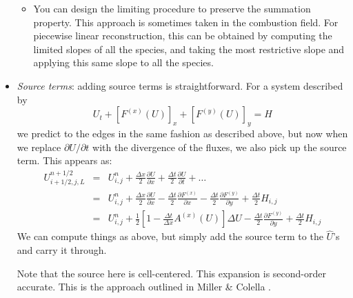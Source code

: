 \documentclass[11pt]{article}
\begin{document}
\begin{itemize}
\begin{itemize}
\item You can design the limiting procedure to preserve the summation
property.  This approach is sometimes taken in the combustion field. 
For piecewise linear reconstruction, this can be obtained by computing
the limited slopes of all the species, and taking the most restrictive
slope and applying this same slope to all the species.
\end{itemize}

\item {\em Source terms}: adding source terms is straightforward.  For
a system described by
\begin{equation}
U_t + [F^{(x)}(U)]_x + [F^{(y)}(U)]_y = H
\end{equation}
we predict to the edges in the same fashion as described above, but now
when we replace $\partial U/\partial t$ with the divergence of the
fluxes, we also pick up the source term.  This appears as:
\begin{eqnarray}
U_{i+1/2,j,L}^{n+1/2} &=& U_{i,j}^n 
            + \frac{\Delta x}{2} \frac{\partial U}{\partial x} 
            + \frac{\Delta t}{2} \frac{\partial U}{\partial t} + \ldots \\
&=& U_{i,j}^n + \frac{\Delta x}{2} \frac{\partial U}{\partial x} 
              - \frac{\Delta t}{2} \frac{\partial F^{(x)}}{\partial x} 
              - \frac{\Delta t}{2} \frac{\partial F^{(y)}}{\partial y} 
              + \frac{\Delta t}{2} H_{i,j} \\
&=& U_{i,j}^n 
 + \frac{1}{2} \left [1 -\frac{\Delta t}{\Delta x} A^{(x)}(U)\right ] \Delta U 
 - \frac{\Delta t}{2} \frac{\partial F^{(y)}}{\partial y}
 + \frac{\Delta t}{2} H_{i,j}
  \label{eq:Utaylorstatesource}
\end{eqnarray}
We can compute things as above, but simply add the source term to the
$\hat{U}$'s and carry it through.  

Note that the source here is cell-centered.  This expansion is
second-order accurate.  This is the approach outlined in Miller 
\& Colella \cite{millercolella:2002}.


\end{itemize}
\end{document}
